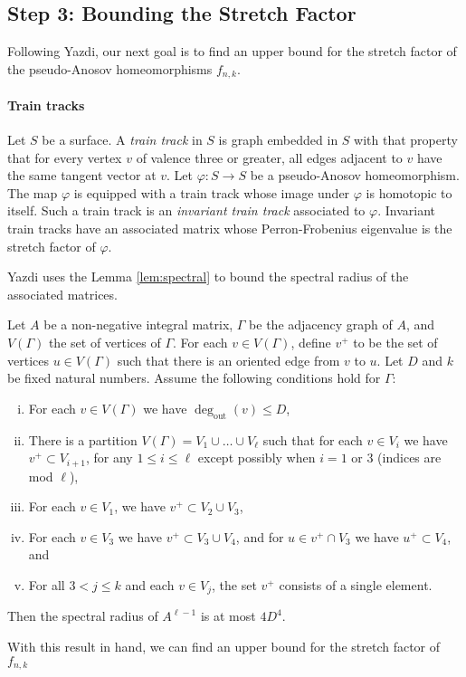 \subsection*{Step 3: Bounding the Stretch Factor}
Following Yazdi, our next goal is to find an upper bound for the stretch factor of the pseudo-Anosov homeomorphisms $f_{n,k}$.


\paragraph{Train tracks} Let $S$ be a surface.  A \textit{train track} in $S$ is graph embedded in $S$ with that property that for every vertex $v$ of valence three or greater, all edges adjacent to $v$ have the same tangent vector at $v$. Let $\varphi:S\rightarrow S$ be a pseudo-Anosov homeomorphism.  The map $\varphi$ is equipped with a train track whose image under $\varphi$ is homotopic to itself.  Such a train track is an \textit{invariant train track} associated to $\varphi$. Invariant train tracks have an associated matrix whose Perron-Frobenius eigenvalue is the stretch factor of $\varphi$.


Yazdi uses the Lemma \ref{lem:spectral} to bound the spectral radius of the associated matrices.

\begin{lem}
\label{lem:spectral}
Let $A$ be a non-negative integral matrix, $\Gamma$ be the adjacency graph of $A$, and $V(\Gamma)$ the set of
vertices of $\Gamma$. For each $v \in V(\Gamma)$, define $v^+$ to be the set of vertices $u\in V(\Gamma)$ such that there
is an oriented edge from $v$ to $u$. Let $D$ and $k$ be fixed natural numbers. Assume the following conditions
hold for $\Gamma$:
\begin{enumerate}[(i)]
\item For each $v \in V(\Gamma)$ we have $\deg_{\text{out}}(v) \leq D$,
\item There is a partition $V(\Gamma) = V_1 \cup \dots \cup V_\ell$ such that for each $v \in V_i$ we have
  $v^+ \subset V_{i+1}$, for any $1 \leq i \leq \ell$ except possibly when $i = 1$ or 3 (indices are mod $\ell$),
\item For each $v \in V_1$, we have $v^+ \subset V_2 \cup V_3$,
\item For each $v \in V_3$ we have $v^+ \subset V_3 \cup V_4$, and for $u \in v^+ \cap V_3$ we have
  $u^+ \subset V_4$, and
\item For all $3 < j \leq k$ and each $v \in V_j$, the set $v^+$ consists of a single element.
\end{enumerate}

Then the spectral radius of $A^{\ell-1}$ is at most $4D^4$.

\end{lem}
\noindent With this result in hand, we can find an upper bound for the stretch factor of $f_{n,k}$

